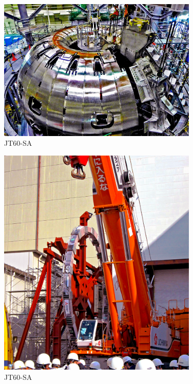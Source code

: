 \begin{figure}
	\centering
	\includegraphics[width=0.85\textwidth]{AppCont/image4.jpg}
	\caption{ JT60-SA\label{figure4}}
\end{figure}
\begin{figure}
	\centering
	\includegraphics[width=0.85\textwidth]{AppCont/image3.jpg}
	\caption{ JT60-SA\label{figure3}}
\end{figure}
